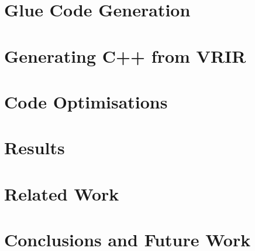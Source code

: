 \documentclass[MSc,twoside,openright]{Thesis}
\begin{document}
\chapter{Glue Code Generation} \label{chap:glueCode}

\chapter{Generating C++ from VRIR} \label{chap:vrirBackend}

\chapter{Code Optimisations} \label{chap:codeOptimise}

\chapter{Results} \label{chap:results}

\chapter{Related Work} \label{chap:Related}


\chapter{Conclusions and Future Work} \label{chap:Conclusions}




%

%



\appendix %


%
%
\end{document}
